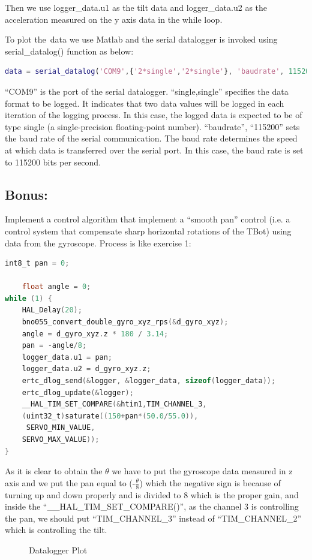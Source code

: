 \documentclass[english]{article}
\begin{document}
Then we use logger\_data.u1 as the tilt data and logger\_data.u2 as the acceleration
measured on the y axis data in the while loop. 
\newline

To plot the\ data we use Matlab and the serial datalogger is invoked using serial\_datalog()
 function as below: 
\begin{lstlisting}[language=Matlab, caption={}, label={lst:datalog} ]
data = serial_datalog('COM9',{'2*single','2*single'}, 'baudrate', 115200)
\end{lstlisting}
“COM9” is the port of the serial datalogger. “single,single” specifies the data 
format to be logged. It indicates that two data values will be logged in each 
iteration of the logging process. In this case, the logged data is expected to be
of type single (a single-precision floating-point number).\newline  
“baudrate”, “115200” sets the baud rate of the serial communication. 
The baud rate determines the speed at which data is transferred over the serial port.
 In this case, the baud rate is set to 115200 bits per second. 

\subsection{Bonus:}
Implement a control algorithm that implement a “smooth pan” control
(i.e. a control system that compensate sharp horizontal rotations of the TBot) 
using data from the gyroscope.\newline
Process is like exercise 1:

\begin{lstlisting}[language=C, caption={}, label={lst:datalog} ]
    int8_t pan = 0; 

    float angle = 0; 
while (1) { 
    HAL_Delay(20); 
    bno055_convert_double_gyro_xyz_rps(&d_gyro_xyz);
    angle = d_gyro_xyz.z * 180 / 3.14;
    pan = -angle/8;
    logger_data.u1 = pan; 
    logger_data.u2 = d_gyro_xyz.z; 
    ertc_dlog_send(&logger, &logger_data, sizeof(logger_data)); 
    ertc_dlog_update(&logger); 
    __HAL_TIM_SET_COMPARE(&htim1,TIM_CHANNEL_3,
    (uint32_t)saturate((150+pan*(50.0/55.0)),
     SERVO_MIN_VALUE,
    SERVO_MAX_VALUE));   
} 
\end{lstlisting}
As it is clear to obtain the $\theta$ we have to put the gyroscope data measured in z axis and we put the pan equal to
(-$\frac{\theta}{8}$) which the negative sign is because of turning up and down
 properly and is divided to 8 which is the proper gain, and inside the “\_\_HAL\_TIM\_SET\_COMPARE()”, as the channel 3 is controlling the pan, 
 we should put “TIM\_CHANNEL\_3” instead of “TIM\_CHANNEL\_2” which is controlling the tilt. 
\begin{figure}[tbh]
    \centering
    
    \caption{Datalogger Plot}
    \label{fig:datal2}
\end{figure}
\end{document}
